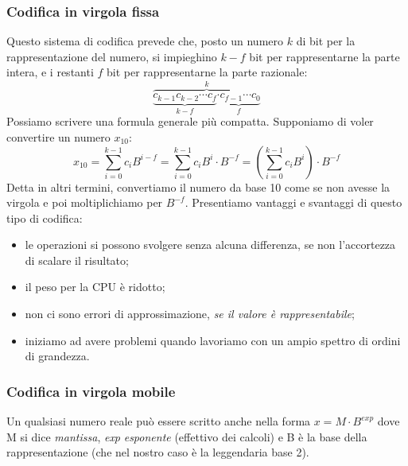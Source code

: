 \documentclass[class=book, crop=false, oneside]{standalone}
\begin{document}
\subsubsection{Codifica in virgola fissa} Questo sistema di codifica prevede che, posto un numero $k$ di bit per la rappresentazione del numero, si impieghino $k-f$ bit per rappresentarne la parte intera, e i restanti $f$ bit per rappresentarne la parte razionale:
\begin{equation*}
	\overbrace{\underbrace{c_{k-1}c_{k-2}\cdots c_{f}}_\text{$k-f$}\underbrace{\cdot c_{f-1}\cdots c_{0}}_\text{$f$}}^\text{$k$}
\end{equation*}
Possiamo scrivere una formula generale più compatta. Supponiamo di voler convertire un numero $x_{10}$:
\begin{equation*}
 	x_{10}=\sum_{i=0}^{k-1} c_{i}B^{i-f}=\sum_{i=0}^{k-1} c_{i}B^{i}\cdot B^{-f}=(\sum_{i=0}^{k-1} c_{i}B^{i})\cdot B^{-f}
 \end{equation*}
Detta in altri termini, convertiamo il numero da base 10 come se non avesse la virgola e poi moltiplichiamo per \(B^{-f}\). Presentiamo vantaggi e svantaggi di questo tipo di codifica:
\begin{itemize}
	\item le operazioni si possono svolgere senza alcuna differenza, se non l'accortezza di scalare il risultato;
	\item il peso per la CPU è ridotto;
	\item non ci sono errori di approssimazione, \emph{se il valore è rappresentabile};
	\item iniziamo ad avere problemi quando lavoriamo con un ampio spettro di ordini di grandezza.
\end{itemize}

\subsubsection{Codifica in virgola mobile}
Un qualsiasi numero reale può essere scritto anche nella forma \(x=M\cdot B^{exp}\) dove M si dice \emph{mantissa}, \emph{exp} \emph{esponente} (effettivo dei calcoli) e B è la base della rappresentazione (che nel nostro caso è la leggendaria base 2).
\end{document}
